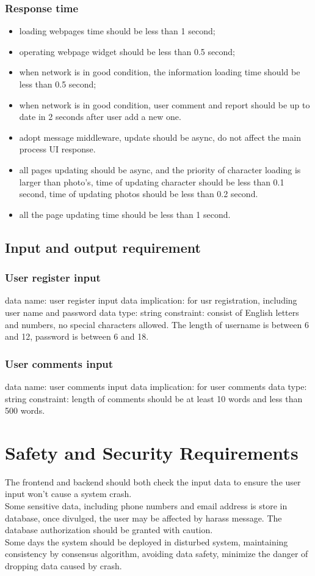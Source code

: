 \documentclass[16pt]{scrreprt}
\begin{document}
\subsubsection{Response time}
\begin{itemize}
    \item loading webpages time should be less than 1 second;
    \item operating webpage widget should be less than 0.5 second;
    \item when network is in good condition, the information loading time should be less than 0.5 second;
    \item when network is in good condition, user comment and report should be up to date in 2 seconds after user add a new one.
    \item adopt message middleware, update should be async, do not affect the main process UI response.
    \item all pages updating should be async, and the priority of character loading is larger than photo's, time of updating character should be less than 0.1 second, time of updating photos should be less than 0.2 second.
    \item all the page updating time should be less than 1 second.
\end{itemize}

\subsection{Input and output requirement}
\subsubsection{User register input}
data name: user register input data
implication: for usr registration, including user name and password
data type: string
constraint: consist of English letters and numbers, no special characters allowed. The length of username is between 6 and 12, password is between 6 and 18.
\subsubsection{User comments input}
data name: user comments input data
implication: for user comments 
data type: string
constraint: length of comments should be at least 10 words and less than 500 words.

\section{Safety and Security Requirements}
The frontend and backend should both check the input data to ensure the user input won't cause a system crash.\\
Some sensitive data, including phone numbers and email address is store in database, once divulged, the user may be affected by harass message. The database authorization should be granted with caution.\\ 
Some days the system should be deployed in disturbed system, maintaining consistency by consensus algorithm, avoiding data safety, minimize the danger of dropping data caused by crash.\\
\end{document}
